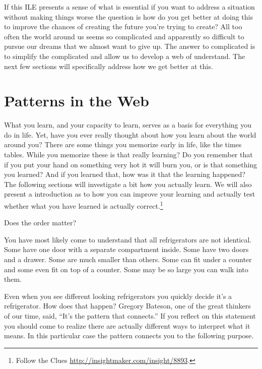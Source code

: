 \documentclass[]{memoir}
\begin{document}
If this ILE presents a sense of what is essential if you want to address
a situation without making things worse the question is how do you get
better at doing this to improve the chances of creating the future
you're trying to create? All too often the world around us seems so
complicated and apparently so difficult to pursue our dreams that we
almost want to give up. The answer to complicated is to simplify the
complicated and allow us to develop a web of understand. The next few
sections will specifically address how we get better at this.

\section{Patterns in the Web}

What you learn, and your capacity to learn, serves as a basis for
everything you do in life. Yet, have you ever really thought about how
you learn about the world around you? There are some things you memorize
early in life, like the times tables. While you memorize these is that
really learning? Do you remember that if you put your hand on something
very hot it will burn you, or is that something you learned? And if you
learned that, how was it that the learning happened? The following
sections will investigate a bit how you actually learn. We will also
present a introduction as to how you can improve your learning and
actually test whether what you have learned is actually
correct.\footnote{Follow the Clues
  \url{http://insightmaker.com/insight/8893}.}

\FloatBarrier 

\begin{model}[frametitle={Model: Follow the clues}] 

 Does the order matter?




 \end{model}

You have most likely come to understand that all refrigerators are not
identical. Some have one door with a separate compartment inside. Some
have two doors and a drawer. Some are much smaller than others. Some can
fit under a counter and some even fit on top of a counter. Some may be
so large you can walk into them.

Even when you see different looking refrigerators you quickly decide
it's a refrigerator. How does that happen? Gregory Bateson, one of the
great thinkers of our time, said, ``It's the pattern that connects.'' If
you reflect on this statement you should come to realize there are
actually different ways to interpret what it means. In this particular
case the pattern connects you to the following purpose.
\end{document}
